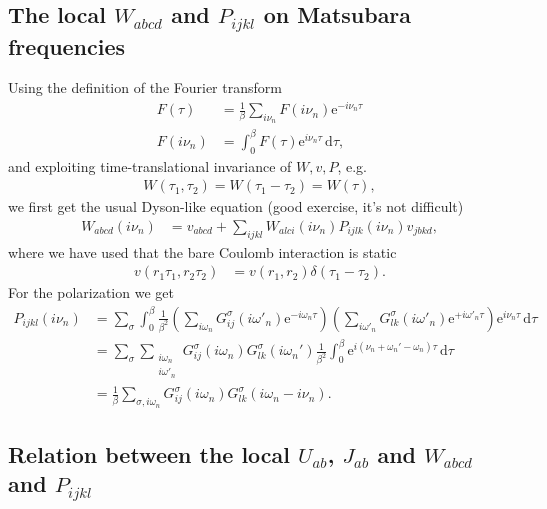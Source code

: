 \documentclass[12pt,a4paper]{scrartcl}
\numberwithin{equation}{section}
\begin{document}
\subsection{The local $W_{abcd}$ and $P_{ijkl}$ on Matsubara frequencies}
\label{sec:local_w_p_matsubara}
Using the definition of the Fourier transform
\begin{align}
 F(\tau)   &= \frac{1}{\beta} \sum_{i\nu_n} F(i\nu_n)\mathrm{e}^{-i\nu_n\tau} \\
 F(i\nu_n) &= \int_{0}^{\beta} F(\tau)\mathrm{e}^{i\nu_n\tau} \, \mathrm{d}\tau,
\end{align}
and exploiting time-translational invariance of $W,v,P$, e.g.
\begin{align}
 W(\tau_1,\tau_2) = W(\tau_1-\tau_2) = W(\tau),
\end{align}
we first get the usual Dyson-like equation (good exercise, it's not difficult)
\begin{align}
W_{abcd}(i\nu_n)
%
&= v_{abcd}  + \sum_{ ijkl }
                     W_{alci}(i\nu_n) P_{ijlk}(i\nu_n)
                     v_{jbkd}, \label{eq:w_dyson_like}
\end{align}
where we have used that the bare Coulomb interaction is static
\begin{align}
 v(r_1\tau_1,r_2\tau_2) &= v(r_1,r_2) \delta(\tau_1-\tau_2).
\end{align}
For the polarization we get
\begin{align}
 P_{ijkl}(i\nu_n)
 &= \sum_{\sigma}\int_{0}^{\beta} \frac{1}{\beta^2}
      \left( \sum_{i\omega_n} G^{\sigma}_{ij}(i\omega'_n) \mathrm{e}^{-i\omega_n\tau} \right)
      \left( \sum_{i\omega'_n} G^{\sigma}_{lk}(i\omega'_n) \mathrm{e}^{+i\omega'_n\tau} \right)
      \mathrm{e}^{i\nu_n\tau} \, \mathrm{d}\tau  \\
%
 &= \sum_{\sigma}\sum_{\substack{i\omega_n\\i\omega'_n}} G^{\sigma}_{ij}(i\omega_n)
                                            G^{\sigma}_{lk}(i\omega_n')
      \frac{1}{\beta^2} \int_{0}^{\beta} \mathrm{e}^{i(\nu_n+\omega_n'-\omega_n) \tau}   \, \mathrm{d}\tau  \\
%
 &=\frac{1}{\beta} \sum_{\sigma,i\omega_n} G^{\sigma}_{ij}(i\omega_n)
                     G^{\sigma}_{lk}(i\omega_n-i\nu_n).
\end{align}




\subsection{Relation between the local $U_{ab}$, $J_{ab}$ and $W_{abcd}$ and $P_{ijkl}$ }
\label{sec:local_gw_form_matsubara}
\end{document}
